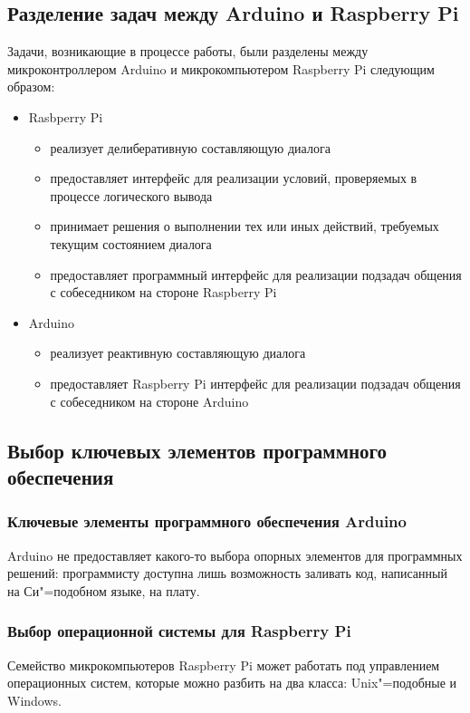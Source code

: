 \subsection{Разделение задач между Arduino и Raspberry Pi}
Задачи, возникающие в процессе работы, были разделены между микроконтроллером Arduino и микрокомпьютером Raspberry Pi следующим образом: 
\begin{itemize}
    \item Rasbperry Pi \begin{itemize}
        \item реализует делиберативную составляющую диалога
        \item предоставляет интерфейс для реализации условий, проверяемых в процессе логического вывода
        \item принимает решения о выполнении тех или иных действий, требуемых текущим состоянием диалога
        \item предоставляет программный интерфейс для реализации подзадач общения с собеседником на стороне Raspberry Pi
    \end{itemize}
    
    \item Arduino \begin{itemize}
        \item реализует реактивную составляющую диалога
        \item предоставляет Raspberry Pi интерфейс для реализации подзадач общения с собеседником на стороне Arduino
    \end{itemize}
\end{itemize}

\subsection{Выбор ключевых элементов программного обеспечения}
\subsubsection{Ключевые элементы программного обеспечения Arduino}
Arduino не предоставляет какого-то выбора опорных элементов для программных решений: программисту доступна лишь возможность заливать код, написанный на Си"=подобном языке, на плату. 

\subsubsection{Выбор операционной системы для Raspberry Pi}
Семейство микрокомпьютеров Raspberry Pi может работать под управлением операционных систем, которые можно разбить на два класса: Unix"=подобные и Windows.

